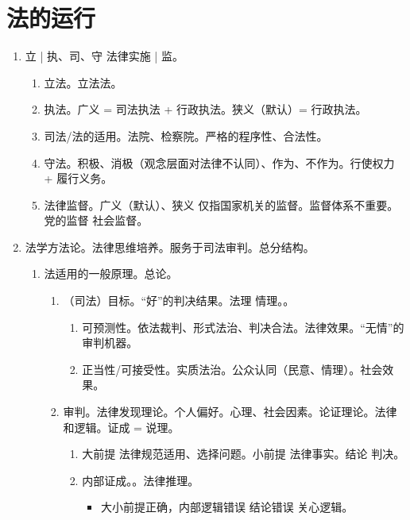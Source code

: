 \section{法的运行}
\begin{enumerate}
  \item 立 | 执、司、守 \yjt 法律实施 | 监。
        \begin{enumerate}
          \item 立法。立法法。
          \item 执法。广义 = 司法执法 + 行政执法。狭义（默认）= 行政执法。
          \item 司法/法的适用。法院、检察院。严格的程序性、合法性。
          \item 守法。积极、消极（观念层面对法律不认同）、作为、不作为。行使权力 + 履行义务。
          \item 法律监督。广义（默认）、狭义 \yjt 仅指国家机关的监督。监督体系不重要。党的监督 \yjt 社会监督。
        \end{enumerate}
  \item 法学方法论。法律思维培养。服务于司法审判。总分结构。
        \begin{enumerate}
          \item 法适用的一般原理。总论。
                \begin{enumerate}
                  \item （司法）目标。“好”的判决结果。法理 \dy 情理。。
                        \begin{enumerate}
                          \item 可预测性。依法裁判、形式法治、判决合法。法律效果。“无情”的审判机器。
                          \item 正当性/可接受性。实质法治。公众认同（民意、情理）。社会效果。
                        \end{enumerate}
                  \item 审判。\yi 法律发现理论。个人偏好。心理、社会因素。\er 论证理论。法律和逻辑。证成 = 说理。
                        \begin{enumerate}
                          \item 大前提 \yjt 法律规范适用、选择问题。小前提 \yjt 法律事实。结论 \yjt 判决。
                          \item 内部证成。。法律推理。
                                \begin{itemize}
                                  \item 大小前提正确，内部逻辑错误 \yjt 结论错误 \yjt 关心逻辑。

\end{itemize}
\end{enumerate}
\end{enumerate}
\end{enumerate}
\end{enumerate}
